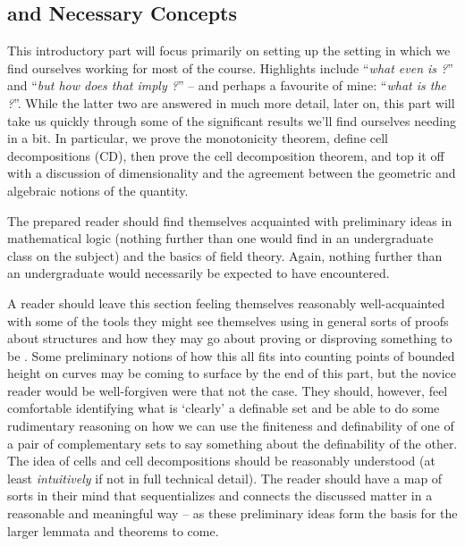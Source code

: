% 
%
%

\begin{partbacktext}
\part{\Omy and Necessary Concepts}
\noindent This introductory part will focus primarily on setting up the setting in which we find ourselves working for most of the course. Highlights include ``\emph{what even is \omy?}'' and ``\emph{but how does that imply \pw?}'' -- and perhaps a favourite of mine: ``\emph{what is the \pwt?}''. While the latter two are answered in much more detail, later on, this part will take us quickly through some of the significant results we'll find ourselves needing in a bit. In particular, we prove the monotonicity theorem, define cell decompositions (CD), then prove the cell decomposition theorem, and top it off with a discussion of dimensionality and the agreement between the geometric and algebraic notions of the quantity.

The prepared reader should find themselves acquainted with preliminary ideas in mathematical logic (nothing further than one would find in an undergraduate class on the subject) and the basics of field theory. Again, nothing further than an undergraduate would necessarily be expected to have encountered.

A reader should leave this section feeling themselves reasonably well-acquainted with some of the tools they might see themselves using in general sorts of proofs about \om structures and how they may go about proving or disproving something to be \om. Some preliminary notions of how this all fits into counting points of bounded height on curves may be coming to surface by the end of this part, but the novice reader would be well-forgiven were that not the case. They should, however, feel comfortable identifying what is `clearly' a definable set and be able to do some rudimentary reasoning on how we can use the finiteness and definability of one of a pair of complementary sets to say something about the definability of the other. The idea of cells and cell decompositions should be reasonably understood (at least \emph{intuitively} if not in full technical detail). The reader should have a map of sorts in their mind that sequentializes and connects the discussed matter in a reasonable and meaningful way -- as these preliminary ideas form the basis for the larger lemmata and theorems to come.

\end{partbacktext}
